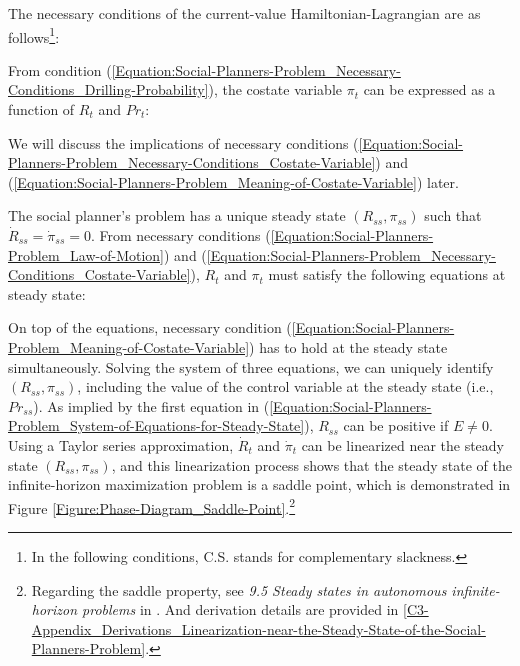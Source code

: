 The necessary conditions of the current-value Hamiltonian-Lagrangian are as follows\footnote{In the following conditions, C.S. stands for complementary slackness.}:

From condition (\ref{Equation:Social-Planners-Problem_Necessary-Conditions_Drilling-Probability}), the costate variable $\pi_{t}$ can be expressed as a function of $R_{t}$ and $Pr_{t}$:

We will discuss the implications of necessary conditions (\ref{Equation:Social-Planners-Problem_Necessary-Conditions_Costate-Variable}) and (\ref{Equation:Social-Planners-Problem_Meaning-of-Costate-Variable}) later. 

The social planner's problem has a unique steady state $(R_{ss}, \pi_{ss})$ such that $\dot{R}_{ss} = \dot{\pi}_{ss} = 0$. From necessary conditions (\ref{Equation:Social-Planners-Problem_Law-of-Motion}) and (\ref{Equation:Social-Planners-Problem_Necessary-Conditions_Costate-Variable}), $R_{t}$ and $\pi_{t}$ must satisfy the following equations at steady state:

On top of the equations, necessary condition (\ref{Equation:Social-Planners-Problem_Meaning-of-Costate-Variable}) has to hold at the steady state simultaneously. Solving the system of three equations, we can uniquely identify $(R_{ss}, \pi_{ss})$, including the value of the control variable at the steady state (i.e., $Pr_{ss}$). As implied by the first equation in (\ref{Equation:Social-Planners-Problem_System-of-Equations-for-Steady-State}), $R_{ss}$ can be positive if $E \neq 0$. Using a Taylor series approximation, $\dot{R}_{t}$ and $\dot{\pi}_{t}$ can be linearized near the steady state $(R_{ss}, \pi_{ss})$, and this linearization process shows that the steady state of the infinite-horizon maximization problem is a saddle point, which is demonstrated in Figure \ref{Figure:Phase-Diagram_Saddle-Point}.\footnote{Regarding the saddle property, see \textit{9.5 Steady states in autonomous infinite-horizon problems} in \cite{Optimal-Control-Theory-and-Static-Optimization-in-Economics_Leonard-and-Long_1992}. And derivation details are provided in \ref{C3-Appendix_Derivations_Linearization-near-the-Steady-State-of-the-Social-Planners-Problem}.}
